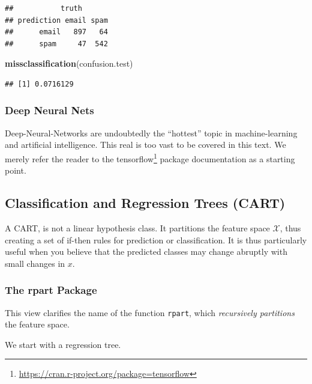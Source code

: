 \documentclass[]{book}
\newenvironment{Shaded}{\begin{snugshade}}{\end{snugshade}}
\newcommand{\CommentTok}[1]{\textcolor[rgb]{0.56,0.35,0.01}{\textit{#1}}}
\newcommand{\DataTypeTok}[1]{\textcolor[rgb]{0.13,0.29,0.53}{#1}}
\newcommand{\FloatTok}[1]{\textcolor[rgb]{0.00,0.00,0.81}{#1}}
\newcommand{\KeywordTok}[1]{\textcolor[rgb]{0.13,0.29,0.53}{\textbf{#1}}}
\newcommand{\NormalTok}[1]{#1}
\newcommand{\OperatorTok}[1]{\textcolor[rgb]{0.81,0.36,0.00}{\textbf{#1}}}
\newcommand{\StringTok}[1]{\textcolor[rgb]{0.31,0.60,0.02}{#1}}
\renewcommand{\href}[2]{#2\footnote{\url{#1}}}
\theoremstyle{definition}
\theoremstyle{definition}
\theoremstyle{definition}
\theoremstyle{remark}
\begin{document}
\begin{verbatim}
##           truth
## prediction email spam
##      email   897   64
##      spam     47  542
\end{verbatim}

\begin{Shaded}
\begin{Highlighting}[]
\KeywordTok{missclassification}\NormalTok{(confusion.test)}
\end{Highlighting}
\end{Shaded}

\begin{verbatim}
## [1] 0.0716129
\end{verbatim}

\hypertarget{deep-neural-nets}{%
\subsubsection{Deep Neural Nets}\label{deep-neural-nets}}

Deep-Neural-Networks are undoubtedly the ``hottest'' topic in machine-learning and artificial intelligence.
This real is too vast to be covered in this text.
We merely refer the reader to the \href{https://cran.r-project.org/package=tensorflow}{tensorflow} package documentation as a starting point.

\hypertarget{trees}{%
\subsection{Classification and Regression Trees (CART)}\label{trees}}

A CART, is not a linear hypothesis class.
It partitions the feature space \(\mathcal{X}\), thus creating a set of if-then rules for prediction or classification.
It is thus particularly useful when you believe that the predicted classes may change abruptly with small changes in \(x\).

\hypertarget{rpart}{%
\subsubsection{The rpart Package}\label{rpart}}

This view clarifies the name of the function \texttt{rpart}, which \emph{recursively partitions} the feature space.

We start with a regression tree.

\begin{Shaded}
\end{Shaded}
\end{document}
